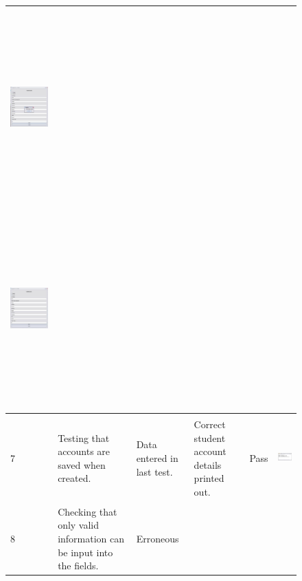 \documentclass[letterpaper]{article}
\begin{document}
\begin{figure}[hbp]
\begin{minipage}{12.1146in}
\begin{flushleft}
\begin{supertabular}{|m{0.8913598in}|m{1.0997599in}|m{3.3018599in}|m{0.8809598in}|m{0.6198598in}|m{4.84626in}|}
 \includegraphics[width=2.8437in,height=2.9689in]{Tests_files/image011.jpg} 
\includegraphics[width=2.8228in,height=3.0209in]{Tests_files/image012.jpg} \\\hline
{\color{black} 7} &
{\color{black} Testing that accounts are saved when created.} &
{\color{black} Data entered in last test.} &
{\color{black} Correct student account details printed out.} &
{\color{black} Pass} &
 \includegraphics[width=2.3854in,height=1.2602in]{Tests_files/image013.jpg} \\\hline
{\color{black} 8} &
{\color{black} Checking that only valid information can be input into the fields.} &
{\color{black} Erroneous}


\end{supertabular}
\end{flushleft}
\end{minipage}
\end{figure}
\end{document}
